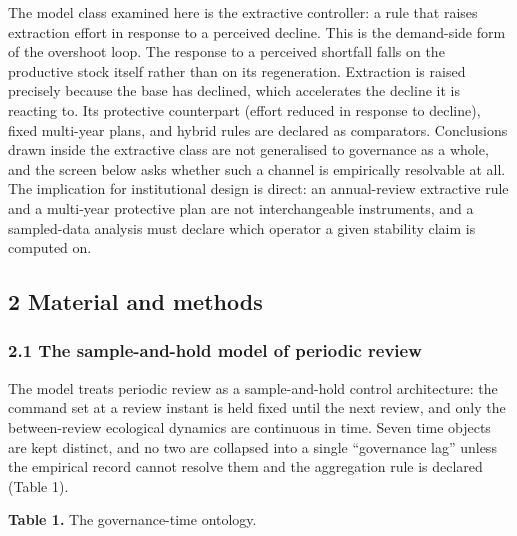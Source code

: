 \documentclass[11pt]{article}
\begin{document}
The model class examined here is the extractive controller: a rule that
raises extraction effort in response to a perceived decline. This is the
demand-side form of the overshoot loop. The response to a perceived
shortfall falls on the productive stock itself rather than on its
regeneration. Extraction is raised precisely because the base has
declined, which accelerates the decline it is reacting to. Its
protective counterpart (effort reduced in response to decline), fixed
multi-year plans, and hybrid rules are declared as comparators.
Conclusions drawn inside the extractive class are not generalised to
governance as a whole, and the screen below asks whether such a channel
is empirically resolvable at all. The implication for institutional
design is direct: an annual-review extractive rule and a multi-year
protective plan are not interchangeable instruments, and a sampled-data
analysis must declare which operator a given stability claim is computed
on.

\subsection{2 Material and methods}\label{material-and-methods}

\subsubsection{2.1 The sample-and-hold model of periodic
review}\label{the-sample-and-hold-model-of-periodic-review}

The model treats periodic review as a sample-and-hold control
architecture: the command set at a review instant is held fixed until
the next review, and only the between-review ecological dynamics are
continuous in time. Seven time objects are kept distinct, and no two are
collapsed into a single ``governance lag'' unless the empirical record
cannot resolve them and the aggregation rule is declared (Table 1).

\textbf{Table 1.} The governance-time ontology.
\end{document}
